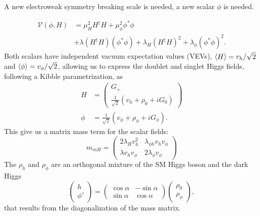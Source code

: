 \documentclass{../bredelebeamer}
\begin{document}
\begin{frame}{A new electroweak symmetry breaking scale is needed, a new scalar $\phi$ is needed.}

		\begin{equation}
    \begin{aligned}
        \mathcal V(\phi,H)
				&= \mu_H^2 H^{\dagger} H 
				+\mu_\phi^2 \phi^* \phi
				\\
				&+\lambda\left(H^{\dagger} H\right)\left(\phi^* \phi\right)
				+\lambda_H\left(H^{\dagger} H\right)^2
				+\lambda_\phi\left(\phi^* \phi\right)^2.
				\end{aligned}
		\end{equation}
		\pause
		Both scalars have independent vacuum expectation values (VEVs), $\expval{H}=v_h/\sqrt2$ and $\expval\phi =v_\phi/\sqrt2$, allowing us to express the doublet and singlet Higgs fields, following a Kibble parametrization, as 
		\begin{align}
				H & = \begin{pmatrix}
						G_{+} \\
						\frac{1}{\sqrt{2}}\left(v_h+\rho_0+i G_{0}\right)
				\end{pmatrix}\label{eq:higgskibblepara1}
				\\
				\phi & =\frac{1}{\sqrt{2}}\left(v_\phi + \rho_\phi+i G_{\phi}\right). \label{eq:higgskibblepara2}
		\end{align}
		\pause
		This give us a matrix mass term for the scalar fields:
		\begin{equation}
			m_{m H}=\left(\begin{array}{cc}
			2 \lambda_H v_h^2 & \lambda_{\phi h}  v_h v_\phi \\
			\lambda v_h v_\phi & 2 \lambda_\phi v_\phi^{ }
			\end{array}\right)
		\end{equation}
		\pause
		The $\rho_h$ and $\rho_\phi$ are an orthogonal mixture of the SM Higgs boson and the dark Higgs
		\begin{equation}
				\begin{pmatrix}
						h
						\\
						\phi'
				\end{pmatrix}
				=
				\begin{pmatrix}
						\cos\alpha & -\sin\alpha
						\\
						\sin\alpha & \cos\alpha
				\end{pmatrix}
				\begin{pmatrix}
						\rho_0
						\\
						\rho_\phi
				\end{pmatrix},
		\end{equation}
		that results from the diagonalization of the mass matrix.	
\end{frame}
\end{document}
